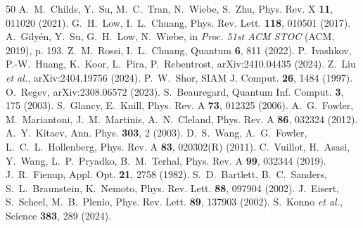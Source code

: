 \documentclass[aps,pra,reprint,superscriptaddress,nofootinbib]{revtex4-2}
\begin{document}
\begin{thebibliography}{50}
 A.~M.~Childs, Y.~Su, M.~C.~Tran, N.~Wiebe, S.~Zhu,
Phys. Rev. X \textbf{11}, 011020 (2021).
 G.~H.~Low, I.~L.~Chuang, Phys. Rev. Lett. \textbf{118},
010501 (2017).
 A.~Gily\'en, Y.~Su, G.~H.~Low, N.~Wiebe, in {\it
Proc. 51st ACM STOC} (ACM, 2019), p. 193.
 Z.~M.~Rossi, I.~L.~Chuang, Quantum \textbf{6}, 811
(2022).
 P.~Ivashkov, P.-W.~Huang, K.~Koor, L.~Pira,
P.~Rebentrost, arXiv:2410.04435 (2024).
 Z.~Liu \emph{et al.}, arXiv:2404.19756 (2024).
 P.~W.~Shor, SIAM J. Comput. \textbf{26}, 1484 (1997).
 O.~Regev, arXiv:2308.06572 (2023).
 S.~Beauregard, Quantum Inf. Comput. \textbf{3},
175 (2003).
 S.~Glancy, E.~Knill, Phys. Rev. A \textbf{73}, 012325
(2006).
 A.~G.~Fowler, M.~Mariantoni, J.~M.~Martinis,
A.~N.~Cleland, Phys. Rev. A \textbf{86}, 032324 (2012).
 A.~Y.~Kitaev, Ann. Phys. \textbf{303}, 2 (2003).
 D.~S.~Wang, A.~G.~Fowler, L.~C.~L.~Hollenberg,
Phys. Rev. A \textbf{83}, 020302(R) (2011).
 C.~Vuillot, H.~Asasi, Y.~Wang, L.~P.~Pryadko,
B.~M.~Terhal, Phys. Rev. A \textbf{99}, 032344 (2019).
 J.~R.~Fienup, Appl. Opt. \textbf{21}, 2758 (1982).
 S.~D.~Bartlett, B.~C.~Sanders, S.~L.~Braunstein,
K.~Nemoto, Phys. Rev. Lett. \textbf{88}, 097904 (2002).
 J.~Eisert, S.~Scheel, M.~B.~Plenio, Phys. Rev. Lett.
\textbf{89}, 137903 (2002).
 S.~Konno \emph{et al.}, Science \textbf{383}, 289
(2024).
\end{thebibliography}
\end{document}
